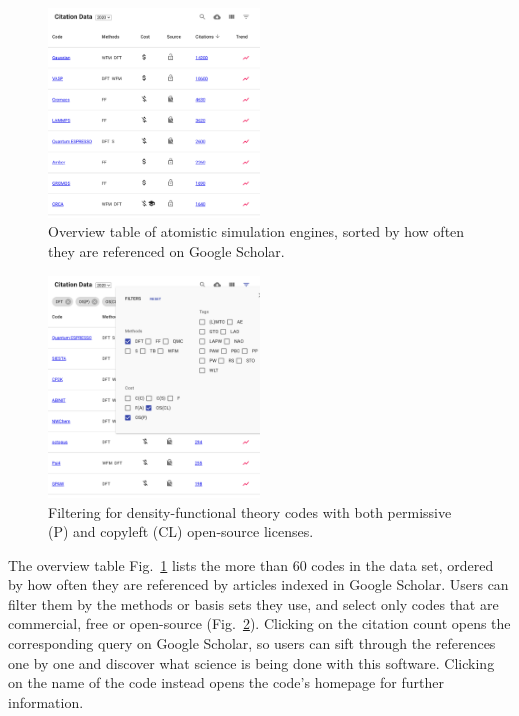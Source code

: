 \documentclass[9pt,review]{livecoms}
\begin{document}
\begin{figure}
    \includegraphics[width=0.5\textwidth]{figures/overview}
    \caption{
        Overview table of atomistic simulation engines, sorted by how often they are referenced on Google Scholar.
    }
    \label{fig:overview}



\end{figure}
\begin{figure}
    \includegraphics[width=0.5\textwidth]{figures/overview-filter}
    \caption{
        Filtering for density-functional theory codes with both permissive (P) and copyleft (CL) open-source licenses.
    }
    \label{fig:overview-filter}
\end{figure}

The overview table Fig.~\ref{fig:overview} lists the more than 60 codes in the data set, ordered by how often they are referenced by articles indexed in Google Scholar. 
Users can filter them by the methods or basis sets they use, and select only codes that are commercial, free or open-source (Fig.~\ref{fig:overview-filter}). 
Clicking on the citation count opens the corresponding query on Google Scholar, so users can sift through the references one by one and discover what science is being done with this software.
Clicking on the name of the code instead opens the code's homepage for further information.
\end{document}
